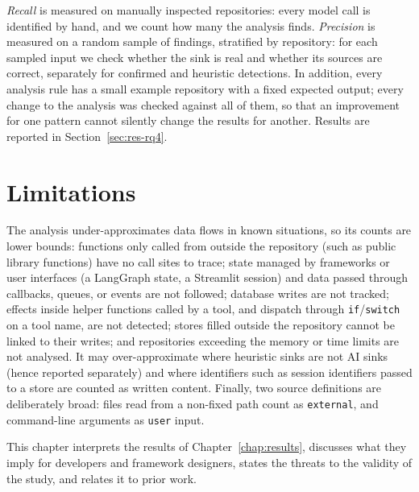 \emph{Recall} is measured on manually inspected repositories: every model call is identified by hand, and we count how many the analysis finds. \emph{Precision} is measured on a random sample of findings, stratified by repository: for each sampled input we check whether the sink is real and whether its sources are correct, separately for confirmed and heuristic detections. In addition, every analysis rule has a small example repository with a fixed expected output; every change to the analysis was checked against all of them, so that an improvement for one pattern cannot silently change the results for another. Results are reported in Section~\ref{sec:res-rq4}.

\section{Limitations}
\label{sec:df-limitations}

The analysis under-approximates data flows in known situations, so its counts are lower bounds: functions only called from outside the repository (such as public library functions) have no call sites to trace; state managed by frameworks or user interfaces (a LangGraph state, a Streamlit session) and data passed through callbacks, queues, or events are not followed; database writes are not tracked; effects inside helper functions called by a tool, and dispatch through \texttt{if}/\texttt{switch} on a tool name, are not detected; stores filled outside the repository cannot be linked to their writes; and repositories exceeding the memory or time limits are not analysed. It may over-approximate where heuristic sinks are not AI sinks (hence reported separately) and where identifiers such as session identifiers passed to a store are counted as written content. Finally, two source definitions are deliberately broad: files read from a non-fixed path count as \texttt{external}, and command-line arguments as \texttt{user} input.


\providecommand{\pv}[1]{\textcolor{blue}{#1}} %
\label{chap:discussion}

This chapter interprets the results of Chapter~\ref{chap:results}, discusses what they imply for developers and framework designers, states the threats to the validity of the study, and relates it to prior work.

